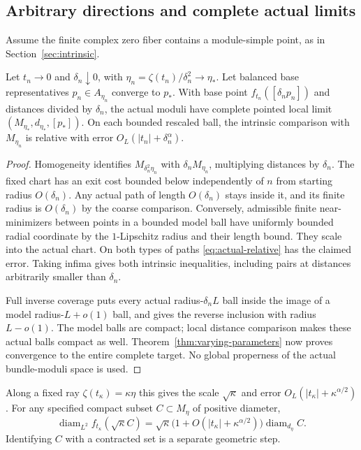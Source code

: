 \subsection{Arbitrary directions and complete actual limits}
Assume the finite complex zero fiber contains a module-simple point,
as in Section~\ref{sec:intrinsic}.
\begin{theorem}\label{thm:actual-limits}
Let $t_n\to0$ and $\delta_n\downarrow0$, with
$\eta_n=\zeta(t_n)/\delta_n^2\to\eta_*$.
Let balanced base representatives $p_n\in A_{\eta_n}$ converge to $p_*$.
With base point $f_{t_n}([\delta_np_n])$ and distances divided by
$\delta_n$, the actual moduli have complete pointed local limit
$(M_{\eta_*},d_{\eta_*},[p_*])$.
On each bounded rescaled ball, the intrinsic comparison with
$M_{\eta_n}$ is relative with error
$O_L(|t_n|+\delta_n^\alpha)$.
\end{theorem}
\begin{proof}
Homogeneity identifies $M_{\delta_n^2\eta_n}$ with
$\delta_nM_{\eta_n}$, multiplying distances by $\delta_n$.
The fixed chart has an exit cost bounded below independently of $n$
from starting radius $O(\delta_n)$. Any actual path of length
$O(\delta_n)$ stays inside it, and its finite radius is $O(\delta_n)$
by the coarse comparison.
Conversely, admissible finite near-minimizers between points in a
bounded model ball have uniformly bounded radial coordinate by
the $1$-Lipschitz radius and their length bound. They scale into
the actual chart. On both types of paths \eqref{eq:actual-relative}
has the claimed error. Taking infima gives both intrinsic inequalities,
including pairs at distances arbitrarily smaller than $\delta_n$.

Full inverse coverage puts every actual radius-$\delta_nL$ ball
inside the image of a model radius-$L+o(1)$ ball, and gives the
reverse inclusion with radius $L-o(1)$.
The model balls are compact; local distance comparison makes these
actual balls compact as well. Theorem~\ref{thm:varying-parameters}
now proves convergence to the entire complete target. No global
properness of the actual bundle-moduli space is used.
\end{proof}

Along a fixed ray $\zeta(t_\kappa)=\kappa\eta$ this gives the scale
$\sqrt\kappa$ and error $O_L(|t_\kappa|+\kappa^{\alpha/2})$.
For any specified compact subset $C\subset M_\eta$ of positive diameter,
\begin{equation}\label{eq:fixed-core-scale}
 \operatorname{diam}_{L^2}
 f_{t_\kappa}(\sqrt\kappa C)
 =\sqrt\kappa\bigl(1+O(|t_\kappa|+\kappa^{\alpha/2})\bigr)
      \operatorname{diam}_{d_\eta}C.
\end{equation}
Identifying $C$ with a contracted set is a separate geometric step.

